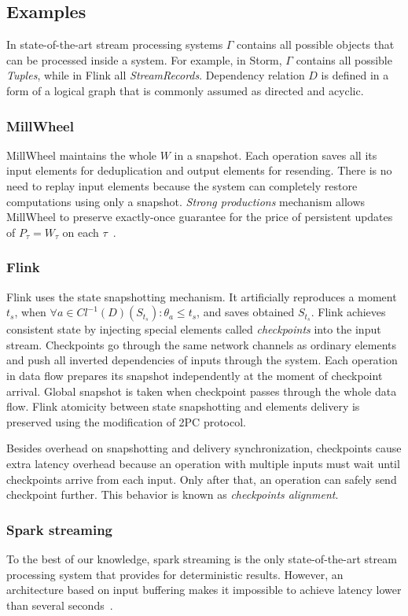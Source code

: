 \subsection{Examples}

In state-of-the-art stream processing systems $\Gamma$ contains all possible objects that can be processed inside a system. For example, in Storm, $\Gamma$ contains all possible {\em Tuples}, while in Flink all {\em StreamRecords}. Dependency relation $D$ is defined in a form of a logical graph that is commonly assumed as directed and acyclic.

\subsubsection{MillWheel}

MillWheel maintains the whole $W$ in a snapshot. Each operation saves all its input elements for deduplication and output elements for resending. There is no need to replay input elements because the system can completely restore computations using only a snapshot. {\em Strong productions} mechanism allows MillWheel to preserve exactly-once guarantee for the price of persistent updates of $P_\tau=W_\tau$ on each $\tau$~\cite{Akidau:2013:MFS:2536222.2536229}.    

\subsubsection{Flink}

Flink uses the state snapshotting mechanism. It artificially reproduces a moment $t_s$, when $\forall{a}\in{Cl^{-1}(D)(S_{t_s})}:\theta_a \leq t_s$, and saves obtained $S_{t_s}$. Flink achieves consistent state by injecting special elements called {\em checkpoints} into the input stream. Checkpoints go through the same network channels as ordinary elements and push all inverted dependencies of inputs through the system. Each operation in data flow prepares its snapshot independently at the moment of checkpoint arrival. Global snapshot is taken when checkpoint passes through the whole data flow. Flink atomicity between state snapshotting and elements delivery is preserved using the modification of 2PC protocol.

Besides overhead on snapshotting and delivery synchronization, checkpoints cause extra latency overhead because an operation with multiple inputs must wait until checkpoints arrive from each input. Only after that, an operation can safely send checkpoint further. This behavior is known as {\em checkpoints alignment}.

\subsubsection{Spark streaming}

To the best of our knowledge, spark streaming is the only state-of-the-art stream processing system that provides for deterministic results. However, an architecture based on input buffering makes it impossible to achieve latency lower than several seconds~\cite{7530084, 7474816}. 